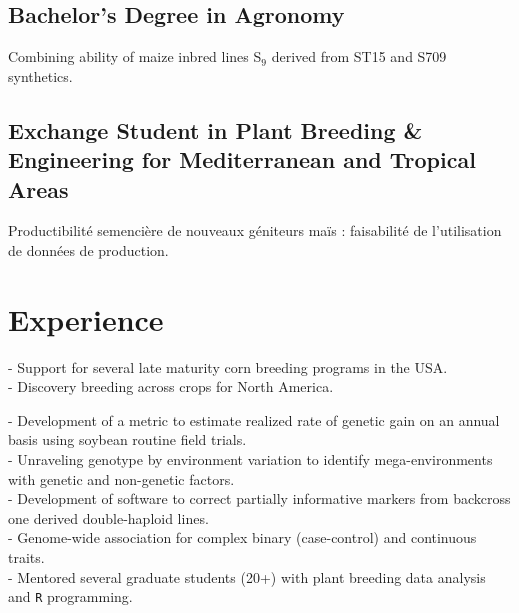 \documentclass[]{mdkrause_cv_openfont}
\begin{document}
\begin{minipage}[t]{1\textwidth}
\sectionsep

\subsection{Bachelor's Degree in Agronomy}
 Combining ability of maize inbred lines S$_9$ derived from ST15 and S709 synthetics.

\sectionsep

\subsection{Exchange Student in Plant Breeding \& Engineering for Mediterranean and Tropical Areas}
 Productibilité semencière de nouveaux géniteurs maïs : faisabilité de l’utilisation de données de production.

\sectionsep


\section{Experience}

\sectionsep

- Support for several late maturity corn breeding programs in the USA. \\
- Discovery breeding across crops for North America.

\sectionsep

- Development of a metric to estimate realized rate of genetic gain on an annual basis using soybean routine field trials. \\
- Unraveling genotype by environment variation to identify mega-environments with genetic and non-genetic factors. \\
- Development of software to correct partially informative markers from backcross one derived double-haploid lines. \\
- Genome-wide association for complex binary (case-control) and continuous traits. \\
- Mentored several graduate students (20+) with plant breeding data analysis and \texttt{R} programming. 


\end{minipage}
\end{document}
